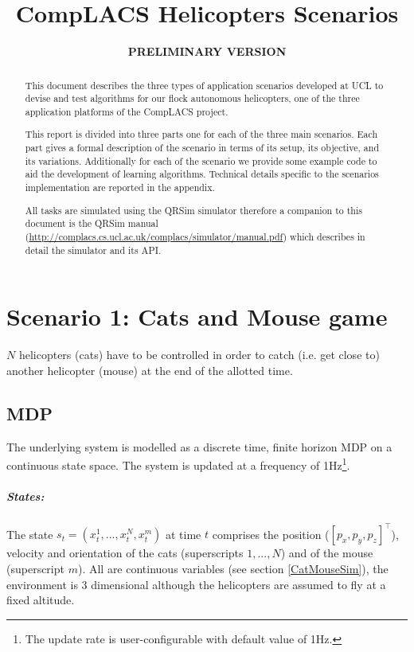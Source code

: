\documentclass[a4paper,11pt]{report}
\title{{CompLACS} Helicopters Scenarios}
\author{\bf PRELIMINARY VERSION}
\newcommand{\sname}{QRSim\xspace}
\newcommand{\webman}{\url{http://complacs.cs.ucl.ac.uk/complacs/simulator/manual.pdf}\xspace}
\begin{document}
\maketitle

\begin{abstract}
This document describes the three types of application scenarios developed at UCL to devise and test algorithms for our flock autonomous helicopters, one of the three application platforms of the {CompLACS} project.

This report is divided into three parts one for each of the three main scenarios.
Each part gives a formal description of the scenario in terms of its setup, its objective, and its variations. Additionally for each of the scenario we provide some example code to aid the development of learning algorithms. Technical details specific to the scenarios implementation are reported in the appendix. 

All tasks are simulated using the \sname simulator therefore a companion to this document is the \sname manual (\webman) which describes in detail the simulator and its API.

\end{abstract}

\tableofcontents

\chapter{Scenario 1: Cats and Mouse game}
$N$ helicopters (cats) have to be controlled in order to catch (i.e. get close to) another helicopter (mouse) at the end of the allotted time.

\section{MDP}

The underlying system is modelled as a discrete time, finite horizon MDP on a continuous state space. The system is updated at a frequency of 1Hz\footnote{The update rate is user-configurable with default value of 1Hz.}. 

\paragraph{States:} The state $s_t = (x^1_t,...,x^{N}_t,x^m_t)$ at time $t$ comprises the position ($[p_x,p_y,p_z]^\intercal$), velocity and orientation of the cats (superscripts $1,...,N$) and of the mouse (superscript $m$). All are continuous variables (see section \ref{CatMouseSim}), the environment is 3 dimensional although the helicopters are assumed to fly at a fixed altitude.
\end{document}
